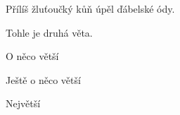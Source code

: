 \documentclass[a4paper, 12pt]{article}
\begin{document}
    Přílíš žluťoučký kůň úpěl ďábelské ódy. %
    
    Tohle je druhá věta.
    
    \large{O něco větší}

    \Large{Ještě o něco větší}

    \LARGE{Největší}
\end{document}

